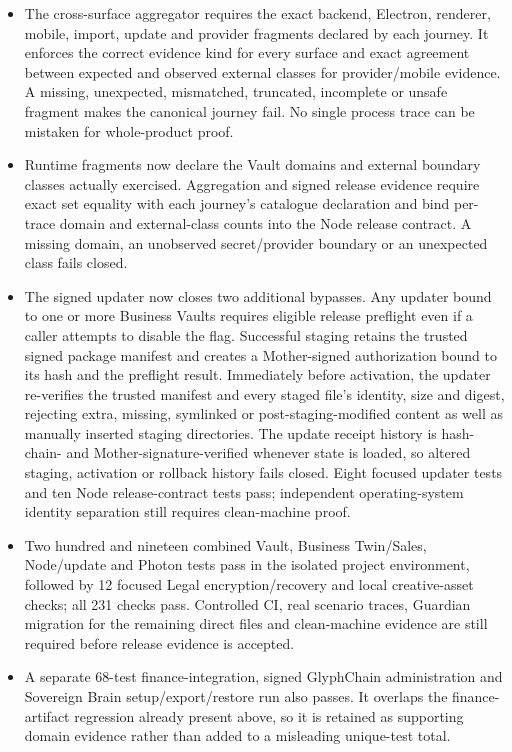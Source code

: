 \documentclass[11pt]{article}
\begin{document}
\begin{itemize}
  \item The cross-surface aggregator requires the exact backend, Electron, renderer, mobile, import, update and provider fragments declared by each journey. It enforces the correct evidence kind for every surface and exact agreement between expected and observed external classes for provider/mobile evidence. A missing, unexpected, mismatched, truncated, incomplete or unsafe fragment makes the canonical journey fail. No single process trace can be mistaken for whole-product proof.
  \item Runtime fragments now declare the Vault domains and external boundary classes actually exercised. Aggregation and signed release evidence require exact set equality with each journey's catalogue declaration and bind per-trace domain and external-class counts into the Node release contract. A missing domain, an unobserved secret/provider boundary or an unexpected class fails closed.
  \item The signed updater now closes two additional bypasses. Any updater bound to one or more Business Vaults requires eligible release preflight even if a caller attempts to disable the flag. Successful staging retains the trusted signed package manifest and creates a Mother-signed authorization bound to its hash and the preflight result. Immediately before activation, the updater re-verifies the trusted manifest and every staged file's identity, size and digest, rejecting extra, missing, symlinked or post-staging-modified content as well as manually inserted staging directories. The update receipt history is hash-chain- and Mother-signature-verified whenever state is loaded, so altered staging, activation or rollback history fails closed. Eight focused updater tests and ten Node release-contract tests pass; independent operating-system identity separation still requires clean-machine proof.
  \item Two hundred and nineteen combined Vault, Business Twin/Sales, Node/update and Photon tests pass in the isolated project environment, followed by 12 focused Legal encryption/recovery and local creative-asset checks; all 231 checks pass. Controlled CI, real scenario traces, Guardian migration for the remaining direct files and clean-machine evidence are still required before release evidence is accepted.
  \item A separate 68-test finance-integration, signed GlyphChain administration and Sovereign Brain setup/export/restore run also passes. It overlaps the finance-artifact regression already present above, so it is retained as supporting domain evidence rather than added to a misleading unique-test total.

\end{itemize}
\end{document}
